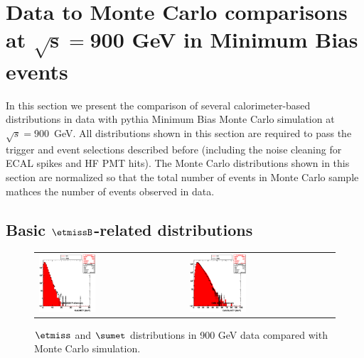 \section[Data to Monte Carlo comparisons at $\sqrt{s}=900$ GeV in
  Minimum Bias events]{Data to Monte Carlo comparisons at $\boldsymbol{\sqrt{s}=900}$ GeV in
  Minimum Bias events}
\label{sc:DataVsMCMB900}

In this section we present the comparison of several calorimeter-based
distributions in data with {\sc pythia} Minimum Bias Monte Carlo simulation at $\sqrt{s}=900$~GeV. 
All distributions shown in this section are required to pass the trigger and event selections
described before (including the noise cleaning for ECAL spikes and HF PMT hits). 
The Monte Carlo distributions shown in this section
are normalized so that the total number of events in Monte Carlo sample
mathces the number of events observed in data.

\subsection[Basic $\etmiss$-related distributions]{Basic $\etmissB$-related distributions}
\begin{figure}[h!]
 \centering
 \begin{tabular}{ll}
  \includegraphics[width=0.40\textwidth]{plots_DataVsMC_MB_900GeV/h_calometPt.eps} &
  \includegraphics[width=0.40\textwidth]{plots_DataVsMC_MB_900GeV/h_caloSumet.eps} \\
 \end{tabular}
 \caption{$\etmiss$ and $\sumet$ distributions in 900 GeV data compared
   with Monte Carlo simulation.
          \label{fig:DataVsMC_MB_900_1}}
\end{figure}

